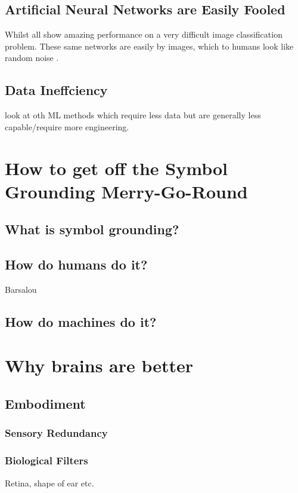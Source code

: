 \subsection{Artificial Neural Networks are Easily Fooled}
Whilst \cite{krizhevsky2012imagenet, simonyan2014very, szegedy2015going, szegedy2016rethinking, szegedy2017inception, he2016deep, huang2017densely} all show amazing performance on a very difficult image classification problem. These same networks are easily by images, which to humans look like random noise \cite{nguyen2015deep}.

\subsection{Data Ineffciency}
look at oth ML methods which require less data but are generally less capable/require more engineering.


\section{How to get off the Symbol Grounding Merry-Go-Round} 
\subsection{What is symbol grounding?}
\subsection{How do humans do it?}
Barsalou

\subsection{How do machines do it?}

\section{Why brains are better}
\subsection{Embodiment}
\subsubsection{Sensory Redundancy}
\subsubsection{Biological Filters}
Retina, shape of ear etc.
